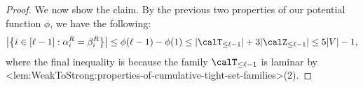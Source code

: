 \documentclass{article}
\def\Cref#1{<#1>}%
\newcommand{\cumulativeMaximalTightSetFamily}[1]{\ensuremath{\calT_{\leq #1}}}
\newcommand{\cumulativeZeros}[1]{\ensuremath{\calZ_{\leq #1}}\xspace}
\begin{document}
\begin{proof}
We now show the claim. By the previous two properties of our potential function $\phi$, we have the following:
$$\left|\left\{i \in [\ell - 1] : \alpha_i^R = \beta_i^R\right\}\right| \leq \phi(\ell - 1) - \phi(1) \leq |\cumulativeMaximalTightSetFamily{\ell - 1}| + 3|\cumulativeZeros{\ell - 1}| \leq 5|V| - 1,$$
where the final inequality is because the family $\cumulativeMaximalTightSetFamily{\ell - 1}$ is laminar by \Cref{lem:WeakToStrong:properties-of-cumulative-tight-set-families}(2).
\end{proof}

\end{document}
